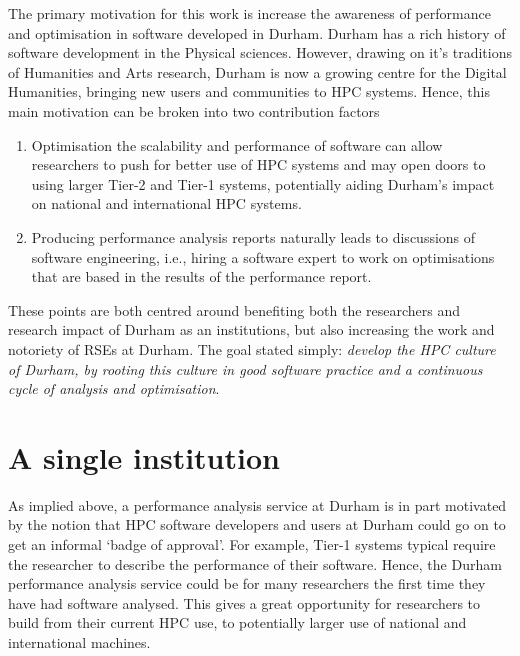 The primary motivation for this work is increase the awareness of performance and optimisation in software developed in Durham. Durham has a rich history of software development in the Physical sciences. However, drawing on it's traditions of Humanities and Arts research, Durham is now a growing centre for the Digital Humanities, bringing new users and communities to HPC systems. Hence, this main motivation can be broken into two contribution factors
\begin{enumerate}
    \item Optimisation the scalability and performance of software can allow researchers to push for better use of HPC systems and may open doors to using larger Tier-2 and Tier-1 systems, potentially aiding Durham's impact on national and international HPC systems.
    \item Producing performance analysis reports naturally leads to discussions of software engineering, i.e., hiring a software expert to work on optimisations that are based in the results of the performance report. 
\end{enumerate}
These points are both centred around benefiting both the researchers and research impact of Durham as an institutions, but also increasing the work and notoriety of RSEs at Durham. The goal stated simply: \emph{develop the HPC culture of Durham, by rooting this culture in good software practice and a continuous cycle of analysis and optimisation}. 

\section{A single institution}

As implied above, a performance analysis service at Durham is in part motivated by the notion that HPC software developers and users at Durham could go on to get an informal `badge of approval'. For example, Tier-1 systems typical require the researcher to describe the performance of their software. Hence, the Durham performance analysis service could be for many researchers the first time they have had software analysed. This gives a great opportunity for researchers to build from their current HPC use, to potentially larger use of national and international machines.  

